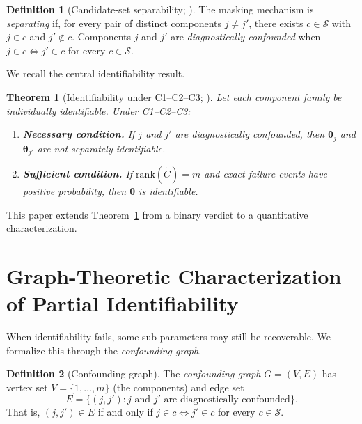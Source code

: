 \documentclass[11pt]{article}
\theoremstyle{definition}
\newtheorem{definition}{Definition}
\theoremstyle{plain}
\newtheorem{theorem}{Theorem}
\renewcommand{\v}[1]{\boldsymbol{#1}}
\newcommand{\btheta}{\v{\theta}}
\newcommand{\rank}{\mathrm{rank}}
\newcommand{\Ctilde}{\tilde{C}}
\begin{document}
\begin{definition}[Candidate-set separability;
\citealp{towell2025masked}]
\label{def:separability}
The masking mechanism is \emph{separating} if, for every pair of
distinct components $j \neq j'$, there exists $c \in \mathcal{S}$
with $j \in c$ and $j' \notin c$.
Components $j$ and $j'$ are \emph{diagnostically confounded} when
$j \in c \iff j' \in c$ for every $c \in \mathcal{S}$.
\end{definition}

We recall the central identifiability result.

\begin{theorem}[Identifiability under C1--C2--C3;
\citealp{towell2025masked}]
\label{thm:identifiability-foundation}
Let each component family be individually identifiable.
Under C1--C2--C3:
\begin{enumerate}[label=(\alph*)]
    \item \textbf{Necessary condition.}
    If $j$ and $j'$ are diagnostically confounded, then $\v{\theta}_j$
    and $\v{\theta}_{j'}$ are not separately identifiable.
    \item \textbf{Sufficient condition.}
    If $\rank(\Ctilde) = m$ and exact-failure events have positive
    probability, then $\btheta$ is identifiable.
\end{enumerate}
\end{theorem}

This paper extends Theorem~\ref{thm:identifiability-foundation}
from a binary verdict to a quantitative characterization.


\section{Graph-Theoretic Characterization of Partial Identifiability}
\label{sec:graph}

When identifiability fails, some sub-parameters may still be
recoverable.
We formalize this through the \emph{confounding graph}.

\begin{definition}[Confounding graph]
\label{def:confounding-graph}
The \emph{confounding graph} $G = (V, E)$ has vertex set
$V = \{1, \ldots, m\}$ (the components) and edge set
\begin{equation}
    E = \bigl\{(j, j') : j \text{ and } j' \text{ are diagnostically confounded}\bigr\}.
\end{equation}
That is, $(j, j') \in E$ if and only if $j \in c \iff j' \in c$
for every $c \in \mathcal{S}$.
\end{definition}
\end{document}
